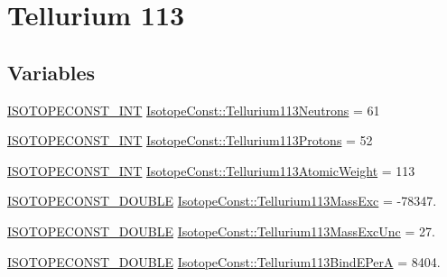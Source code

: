 \hypertarget{group___isotope_const-_tellurium-_te113}{}\section{Tellurium 113}
\label{group___isotope_const-_tellurium-_te113}
\subsection*{Variables}
\begin{DoxyCompactItemize}
\item 
\mbox{\hyperlink{group___isotope_const-_macros_ga5f18360b3e99483a35c32d789e62621c}{I\+S\+O\+T\+O\+P\+E\+C\+O\+N\+S\+T\+\_\+\+I\+NT}} \mbox{\hyperlink{group___isotope_const-_tellurium-_te113_gaae2b54ff259f6c2a7e7f860a3666b7d8}{Isotope\+Const\+::\+Tellurium113\+Neutrons}} = 61
\item 
\mbox{\hyperlink{group___isotope_const-_macros_ga5f18360b3e99483a35c32d789e62621c}{I\+S\+O\+T\+O\+P\+E\+C\+O\+N\+S\+T\+\_\+\+I\+NT}} \mbox{\hyperlink{group___isotope_const-_tellurium-_te113_ga756459b61ea68abd67e74f16148d2950}{Isotope\+Const\+::\+Tellurium113\+Protons}} = 52
\item 
\mbox{\hyperlink{group___isotope_const-_macros_ga5f18360b3e99483a35c32d789e62621c}{I\+S\+O\+T\+O\+P\+E\+C\+O\+N\+S\+T\+\_\+\+I\+NT}} \mbox{\hyperlink{group___isotope_const-_tellurium-_te113_gabd9841d658685481defb8309adf585cb}{Isotope\+Const\+::\+Tellurium113\+Atomic\+Weight}} = 113
\item 
\mbox{\hyperlink{group___isotope_const-_macros_ga8f45a7272ce02c0b4c65c44636ed719a}{I\+S\+O\+T\+O\+P\+E\+C\+O\+N\+S\+T\+\_\+\+D\+O\+U\+B\+LE}} \mbox{\hyperlink{group___isotope_const-_tellurium-_te113_gac07e8a2174f40d483354a4aaac367448}{Isotope\+Const\+::\+Tellurium113\+Mass\+Exc}} = -\/78347.
\item 
\mbox{\hyperlink{group___isotope_const-_macros_ga8f45a7272ce02c0b4c65c44636ed719a}{I\+S\+O\+T\+O\+P\+E\+C\+O\+N\+S\+T\+\_\+\+D\+O\+U\+B\+LE}} \mbox{\hyperlink{group___isotope_const-_tellurium-_te113_gae1acf3a3a4144caefc2928f12975ca07}{Isotope\+Const\+::\+Tellurium113\+Mass\+Exc\+Unc}} = 27.
\item 
\mbox{\hyperlink{group___isotope_const-_macros_ga8f45a7272ce02c0b4c65c44636ed719a}{I\+S\+O\+T\+O\+P\+E\+C\+O\+N\+S\+T\+\_\+\+D\+O\+U\+B\+LE}} \mbox{\hyperlink{group___isotope_const-_tellurium-_te113_gaa9f6edbe79f1a627a1fc7303a893890c}{Isotope\+Const\+::\+Tellurium113\+Bind\+E\+PerA}} = 8404.
\item 

\end{DoxyCompactItemize}
